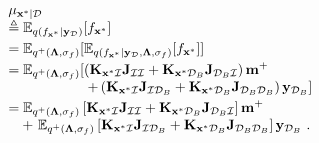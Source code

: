 \documentclass[conference]{IEEEtran}
\begin{document}
	\begin{equation*}
		\begin{array}{l}
			\displaystyle\mu_{\mathbf{x}^*|\mathcal{D}}\\
			\displaystyle\triangleq\mathbb{E}_{q(f_{\mathbf{x}^*}|\mathbf{y}_\mathcal{D})}[f_{\mathbf{x}^*}]\vspace{1mm}\\
			\displaystyle=\mathbb{E}_{q^+(\mathbf{\Lambda},\sigma_f)}[\mathbb{E}_{q(f_{\mathbf{x}^*}|\mathbf{y}_\mathcal{D},\mathbf{\Lambda},\sigma_f)}[f_{\mathbf{x}^*}]] \vspace{1mm}\\
			\displaystyle=\mathbb{E}_{q^+(\mathbf{\Lambda},\sigma_f)}[ \left(\mathbf{K}_{\mathbf{x}^*\mathcal{I}}\mathbf{J}_{\mathcal{I}\mathcal{I}}+\mathbf{K}_{\mathbf{x}^*\mathcal{D}_B}\mathbf{J}_{\mathcal{D}_B\mathcal{I}}\right)\mathbf{m}^+\\
			\displaystyle\qquad\qquad\quad\ \ +\left(\mathbf{K}_{\mathbf{x}^*\mathcal{I}}\mathbf{J}_{\mathcal{I}\mathcal{D}_B}+\mathbf{K}_{\mathbf{x}^*\mathcal{D}_B}\mathbf{J}_{\mathcal{D}_B\mathcal{D}_B}\right)\mathbf{y}_{\mathcal{D}_B} ] \vspace{1mm}\\
			\displaystyle=\mathbb{E}_{q^+(\mathbf{\Lambda},\sigma_f)}\left[\mathbf{K}_{\mathbf{x}^*\mathcal{I}}\mathbf{J}_{\mathcal{I}\mathcal{I}}+\mathbf{K}_{\mathbf{x}^*\mathcal{D}_B}\mathbf{J}_{\mathcal{D}_B\mathcal{I}}\right]\mathbf{m}^+\\
			\displaystyle\quad +\ \mathbb{E}_{q^+(\mathbf{\Lambda},\sigma_f)}\left[\mathbf{K}_{\mathbf{x}^*\mathcal{I}}\mathbf{J}_{\mathcal{I}\mathcal{D}_B}+\mathbf{K}_{\mathbf{x}^*\mathcal{D}_B}\mathbf{J}_{\mathcal{D}_B\mathcal{D}_B}\right]\mathbf{y}_{\mathcal{D}_B}\ .
		\end{array}
	\end{equation*}		
\end{document}
